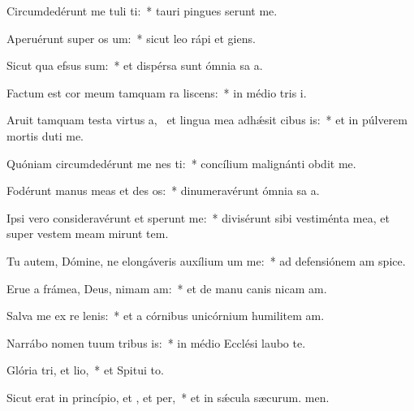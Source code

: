 \item Circumdedérunt me tuli ti:~* tauri pingues serunt me.
\item Aperuérunt super  os um:~* sicut leo rápi et giens.
\item Sicut qua efsus sum:~* et dispérsa sunt ómnia sa a.
\item Factum est cor meum tamquam ra liscens:~* in médio tris i.
\item Aruit tamquam testa virtus a,~\pscross{} et lingua mea adhǽsit cibus is:~* et in púlverem mortis duti me.
\item Quóniam circumdedérunt me nes ti:~* concílium malignánti obdit me.
\item Fodérunt manus meas et des os:~* dinumeravérunt ómnia sa a.
\item Ipsi vero consideravérunt et sperunt me:~* divisérunt sibi vestiménta mea, et super vestem meam mirunt tem.
\item Tu autem, Dómine, ne elongáveris auxílium um  me:~* ad defensiónem am spice.
\item Erue a frámea, Deus, nimam am:~* et de manu canis nicam am.
\item Salva me ex re lenis:~* et a córnibus unicórnium humilitem am.
\item Narrábo nomen tuum tribus is:~* in médio Ecclési laubo te.
\item Glória tri, et lio,~* et Spitui to.
\item Sicut erat in princípio, et , et per,~* et in sǽcula sæcurum. men.
